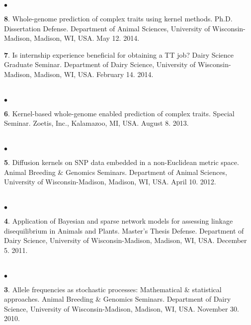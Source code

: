 \documentclass[margin,line,10pt]{res}
\newenvironment{list2}{
  \begin{list}{$\bullet$}{%
      \setlength{\itemsep}{0in}
      \setlength{\parsep}{0in} \setlength{\parskip}{0in}
      \setlength{\topsep}{0in} \setlength{\partopsep}{0in} 
      \setlength{\leftmargin}{0.2in}}}{\end{list}}
\begin{document}
\begin{resume}
\begin{list2}
\item [{\bf 8}.] Whole-genome prediction of complex traits using kernel methods. Ph.D. Dissertation Defense. Department of Animal Sciences, University of Wisconsin-Madison, Madison, WI, USA. May 12. 2014.
\vspace{0.5cm}

\item [{\bf 7}.] Is internship experience beneficial for obtaining a TT job? Dairy Science Graduate Seminar. Department of Dairy Science, University of Wisconsin-Madison, Madison, WI, USA. February 14. 2014.
\end{list2}  

\section{}
\begin{list2}
\item  [{\bf 6}.] Kernel-based whole-genome enabled prediction of complex traits. Special Seminar.  Zoetis, Inc., Kalamazoo, MI, USA. August 8. 2013.
\end{list2}  

\section{}
\begin{list2}
 \item [{\bf 5}.] Diffusion kernels on SNP data embedded in a non-Euclidean metric space. Animal Breeding \& Genomics Seminars.  Department of Animal Sciences, University of Wisconsin-Madison, Madison, WI, USA. April 10. 2012. 
\end{list2}  

\section{}
\begin{list2}
\item  [{\bf 4}.] Application of Bayesian and sparse network models for assessing linkage disequilibrium in Animals and Plants. Master's Thesis Defense.  Department of Dairy Science, University of Wisconsin-Madison, Madison, WI, USA. December 5. 2011. 
\end{list2}  

\section{}
\begin{list2}
\item [{\bf 3}.] Allele frequencies as stochastic processes: Mathematical \& statistical approaches. Animal Breeding \& Genomics Seminars.  Department of Dairy Science, University of Wisconsin-Madison, Madison, WI, USA. November 30. 2010.


\end{list2}
\end{resume}
\end{document}
